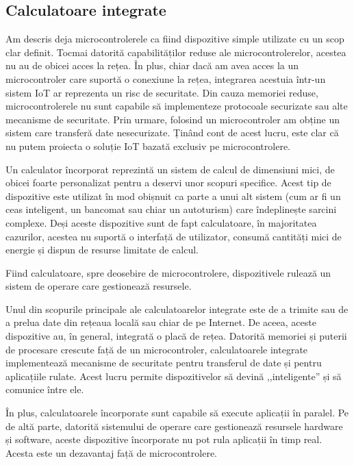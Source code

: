 \subsection{Calculatoare integrate}
\label{sec:embed:micro-comp:embed}

Am descris deja microcontrolerele ca fiind dispozitive simple utilizate cu un
scop clar definit. Tocmai datorită capabilităților reduse ale microcontrolerelor,
acestea nu au de obicei acces la rețea. În plus, chiar dacă am avea acces la un
microcontroler care suportă o conexiune la rețea, integrarea acestuia într-un
sistem IoT ar reprezenta un risc de securitate. Din cauza memoriei reduse,
microcontrolerele nu sunt capabile să implementeze protocoale securizate sau
alte mecanisme de securitate. Prin urmare, folosind un microcontroler am obține
un sistem care transferă date nesecurizate. Ținând cont de acest lucru, este
clar că nu putem proiecta o soluție IoT bazată exclusiv pe microcontrolere.

Un calculator încorporat reprezintă un sistem de calcul de dimensiuni mici, de
obicei foarte personalizat pentru a deservi unor scopuri specifice. Acest tip de
dispozitive este utilizat în mod obișnuit ca parte a unui alt sistem (cum ar fi
un ceas inteligent, un bancomat sau chiar un autoturism) care îndeplinește
sarcini complexe. Deși aceste dispozitive sunt de fapt calculatoare, în
majoritatea cazurilor, acestea nu suportă o interfață de utilizator, consumă
cantități mici de energie și dispun de resurse limitate de calcul.

Fiind calculatoare, spre deosebire de microcontrolere, dispozitivele rulează un
sistem de operare care gestionează resursele.

Unul din scopurile principale ale calculatoarelor integrate este de a trimite
sau de a prelua date din rețeaua locală sau chiar de pe Internet. De aceea,
aceste dispozitive au, în general, integrată o placă de rețea. Datorită memoriei
și puterii de procesare crescute față de un microcontroler, calculatoarele
integrate implementează mecanisme de securitate pentru transferul
de date și pentru aplicațiile rulate. Acest lucru permite dispozitivelor să
devină ,,inteligente'' și să comunice între ele.

În plus, calculatoarele încorporate sunt capabile să execute aplicații în
paralel. Pe de altă parte, datorită sistemului de operare care gestionează
resursele hardware și software, aceste dispozitive încorporate nu pot rula
aplicații în timp real. Acesta este un dezavantaj față de microcontrolere.

